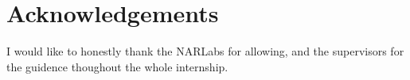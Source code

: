 
\cleardoublepage
\phantom{a}
\vfill

\section*{Acknowledgements}
I would like to honestly thank the NARLabs for allowing, and the supervisors for the guidence thoughout the whole internship.

\cleardoublepage
\tableofcontents









{}


\printbibliography

% 	 


